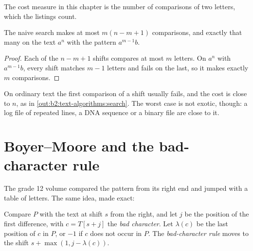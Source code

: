 The cost measure in this chapter is the number of comparisons of two letters, which the listings count.

\label{lst:b2:text-algorithms:naive}

\begin{proposition}\label{prop:b2:text-algorithms:naive}
The naive search makes at most $m(n - m + 1)$ comparisons, and exactly that many on the text $a^n$ with the pattern
$a^{m-1}b$.
\end{proposition}

\begin{proof}
Each of the $n - m + 1$ shifts compares at most $m$ letters. On $a^n$ with $a^{m-1}b$, every shift matches $m - 1$
letters and fails on the last, so it makes exactly $m$ comparisons.
\end{proof}

On ordinary text the first comparison of a shift usually fails, and the cost is close to $n$, as in
\cref{out:b2:text-algorithms:search}. The worst case is not exotic, though: a log file of repeated lines, a DNA
sequence or a binary file are close to it.

\section{Boyer--Moore and the bad-character rule}\label{sec:b2:text-algorithms:boyer-moore}

The grade 12 volume compared the pattern from its right end and jumped with a table of letters. The same idea, made
exact:

\begin{definition}\label{def:b2:text-algorithms:bad-char}
Compare $P$ with the text at shift $s$ from the right, and let $j$ be the position of the first difference, with $c =
T[s + j]$ the \emph{bad character}. Let $\lambda(c)$ be the last position of $c$ in $P$, or $-1$ if $c$ does not occur
in $P$. The \emph{bad-character rule} moves to the shift $s + \max(1, j - \lambda(c))$.
\end{definition}

